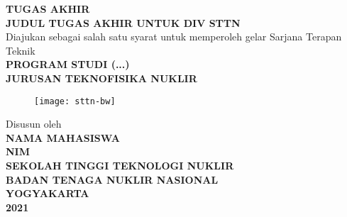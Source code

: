 \begin{titlepage}
	\thispagestyle{plain}
	\begingroup
	\begin{center}
		\singlespacing
		\textbf{TUGAS AKHIR}\\
		\fontsize{14pt}{1.5em}\selectfont
		\textbf{JUDUL TUGAS AKHIR UNTUK DIV STTN}\\[2cm]
		\fontsize{12pt}{1em}\selectfont
		Diajukan sebagai salah satu syarat untuk memperoleh gelar Sarjana Terapan Teknik\\[2cm]
		\fontsize{12pt}{1em}\selectfont
		\textbf{PROGRAM STUDI (...)}\\
		\textbf{JURUSAN TEKNOFISIKA NUKLIR}\\[2cm]
		
		\begin{figure}[h]
			\centering
			\texttt{[image: sttn-bw]}
		\end{figure}
		\vspace{2cm}
		
		Disusun oleh\\
		\textbf{NAMA MAHASISWA\\NIM}\\[2cm]
		
		\textbf{SEKOLAH TINGGI TEKNOLOGI NUKLIR\\BADAN TENAGA NUKLIR NASIONAL\\YOGYAKARTA\\2021}
	\end{center}
	\endgroup
\end{titlepage}